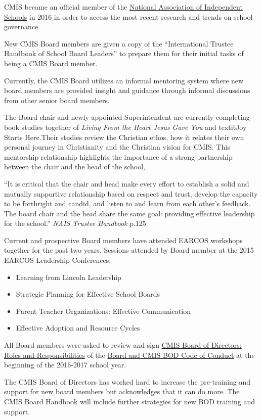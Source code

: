 \begin{findings}
CMIS became an official member of the \href{http://www.nais.org/Articles/Pages/NAIS-Trustee-Handbook-Resources.aspx}{National Association of Independent Schools} in 2016 in order to access the most recent research and trends on school governance. 

New CMIS Board members are given a copy of the “International Trustee Handbook of School Board Leaders” to prepare them for their initial tasks of being a CMIS Board member. 

Currently, the CMIS Board utilizes an informal mentoring system where new board members are provided insight and guidance through informal discussions from other senior board members. 

The Board chair and newly appointed Superintendent are currently completing book studies together of \textit{Living From the Heart Jesus Gave You} and textit{Joy Starts Here}.Their studies review the Christian ethos, how it relates their own personal journey in Christianity and the Christian vision for CMIS. This mentorship relationship highlights the importance of a strong partnership between the chair and the head of the school,

``It is critical that the chair and head make every effort to establish a solid and mutually supportive relationship based on respect and trust, develop the capacity to be forthright and candid, and listen to and learn from each other's feedback. The board chair and the head share the same goal: providing effective leadership for the school.'' \textit{NAIS Trustee Handbook} p.125

Current and prospective Board members have attended EARCOS workshops together for the past two years. Sessions attended by Board member at the 2015 EARCOS Leadership Conferences:
\begin{itemize}
\item Learning from Lincoln Leadership
\item Strategic Planning for Effective School Boards 
\item Parent Teacher Organizations: Effective Communication
\item Effective Adoption and Resource Cycles 
\end{itemize}

All Board members were asked to review and sign \href{https://docs.google.com/a/cmis.ac.th/document/d/1sVjFjeVtwbk0-n8GsM5K_XzZSn2wejtlJ3kurXUrKGU/edit?usp=sharing}{CMIS Board of Directors: Roles and Responsibilities} of the \href{https://docs.google.com/a/cmis.ac.th/document/d/1sVjFjeVtwbk0-n8GsM5K_XzZSn2wejtlJ3kurXUrKGU/edit?usp=sharing}{Board and CMIS BOD Code of Conduct} at the beginning of the 2016-2017 school year.


The CMIS Board of Directors has worked hard to increase the pre-training and support for new board members but acknowledges that it can do more. The CMIS Board Handbook will include further strategies for new BOD training and support.
\end{findings}

